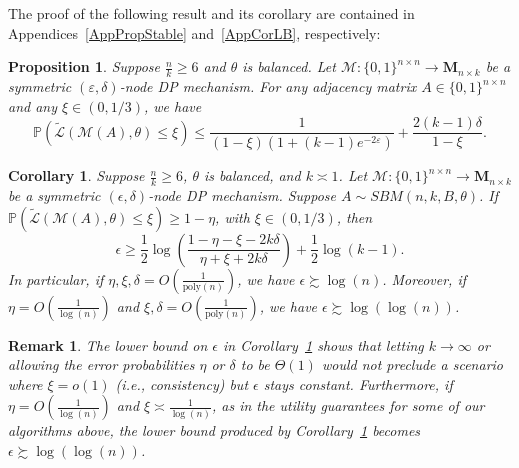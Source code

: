 \documentclass{article}
\newtheorem{remark}{Remark}
\newtheorem{corollary}{Corollary}
\newtheorem{proposition}{Proposition}
\newcommand{\eps}{\varepsilon}
\newcommand{\mprob}{\mathbb{P}}
\newcommand{\calM}{\mathcal{M}}
\begin{document}
The proof of the following result and its corollary are contained in Appendices~\ref{AppPropStable} and~\ref{AppCorLB}, respectively:

\begin{proposition}
\label{prop:LBStable}
Suppose $\frac{n}{k} \ge 6$ and $\theta$ is balanced. Let $\calM: \{0,1\}^{n\times n}\to \mathbf{M}_{n\times k}$ be a symmetric $(\eps, \delta)$-node DP mechanism. For any adjacency matrix $A\in \{0,1\}^{n\times n}$ and any $\xi \in (0,1/3)$, we have
$$
\mathbb{P}(\widetilde{\mathcal{L}}(\mathcal{M}(A), \theta)\leq \xi) \leq \frac{1}{(1-\xi)(1+(k-1)e^{-2\eps})} + \frac{2(k - 1)\delta}{1-\xi}.
$$
\end{proposition}

\begin{corollary}
\label{corr:lb1_lim1}
Suppose $\frac{n}{k} \ge 6$, $\theta$ is balanced, and $k \asymp 1$. Let $\calM: \{0,1\}^{n\times n}\to \mathbf{M}_{n\times k}$ be a symmetric $(\epsilon, \delta)$-node DP mechanism. Suppose $A \sim SBM(n, k, B, \theta)$. If $\mprob(\widetilde{\mathcal{L}}(\mathcal{M}(A), \theta) \le \xi) \ge 1 - \eta$, with $\xi \in (0, 1/3)$, then
\begin{equation*}
\epsilon \ge \frac{1}{2}\log\left(\frac{1-\eta-\xi - 2k \delta}{\eta + \xi + 2k\delta}\right) + \frac{1}{2} \log(k-1).
\end{equation*}
In particular, if $\eta, \xi, \delta = O\left(\frac{1}{\mathrm{poly}(n)}\right)$, we have $\epsilon \succsim \log(n)$. Moreover, if $\eta = O\left(\frac{1}{\log(n)}\right)$ and $\xi, \delta = O\left(\frac{1}{\mathrm{poly}(n)}\right)$, we have $\epsilon \succsim \log(\log(n))$.
\end{corollary}

\begin{remark}
The lower bound on $\epsilon$ in Corollary~\ref{corr:lb1_lim1} shows that letting $k \rightarrow \infty$ or allowing the error probabilities $\eta$ or $\delta$ to be $\Theta(1)$ would not preclude a scenario where $\xi = o(1)$ (i.e., consistency) but $\epsilon$ stays constant. Furthermore, if $\eta = O\left(\frac{1}{\log(n)}\right)$ and $\xi \asymp \frac{1}{\log(n)}$, as in the utility guarantees for some of our algorithms above, the lower bound produced by Corollary~\ref{corr:lb1_lim1} becomes $\epsilon \succsim \log(\log(n))$.
\end{remark}
\end{document}
